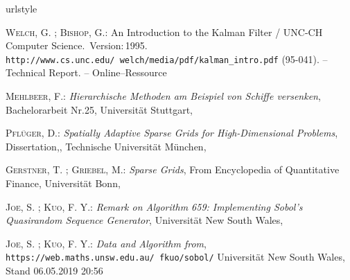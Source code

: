 \documentclass[a4paper,12pt]{llncs}
\numberwithin{equation}{section}
\begin{document}
\begin{thebibliography}{WB95}
	\providecommand{\url}[1]{\texttt{#1}}
	\expandafter\ifx\csname urlstyle\endcsname\relax
	\providecommand{\doi}[1]{doi: #1}\else
	\providecommand{\doi}{doi: \begingroup \urlstyle{rm}\Url}\fi
	
	\textsc{Welch}, G. ; \textsc{Bishop}, G.:
	\newblock An Introduction to the Kalman Filter  / UNC-CH Computer Science.
	\newblock \,Version:\,1995.
	\newblock  \url{http://www.cs.unc.edu/~welch/media/pdf/kalman_intro.pdf}
	(95-041). --
	\newblock Technical Report. --
	\newblock Online--Ressource
	
	\textsc{Mehlbeer}, F.:
	\newblock \textit{Hierarchische Methoden am Beispiel von Schiffe versenken},
	\newblock Bachelorarbeit Nr.25,
	\newblock Universität Stuttgart,
	
	\textsc{Pflüger}, D.:
	\newblock \textit{Spatially Adaptive Sparse Grids for High-Dimensional Problems},
	\newblock Dissertation,,
	\newblock Technische Universität München,
	
	\textsc{Gerstner}, T. ; \textsc{Griebel}, M.:
	\newblock \textit{Sparse Grids},
	\newblock From Encyclopedia of Quantitative Finance,
	\newblock Universität Bonn,
	
	\textsc{Joe}, S. ; \textsc{Kuo}, F. Y.:
	\newblock \textit{Remark on Algorithm 659: Implementing Sobol's Quasirandom Sequence Generator},
	\newblock Universität New South Wales,
	
	\textsc{Joe}, S. ; \textsc{Kuo}, F. Y.:
	\newblock \textit{Data and Algorithm from},
	\newblock \url{https://web.maths.unsw.edu.au/~fkuo/sobol/}
	\newblock Universität New South Wales,
	\newblock Stand 06.05.2019 20:56
	
\end{thebibliography}


\end{document}
